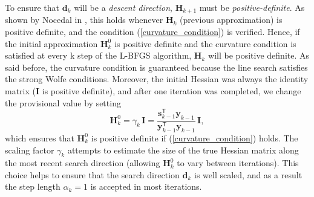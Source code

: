 To ensure that $\mathbf{d}_k$ will be a \emph{descent direction}, $\mathbf{H}_{k+1}$ must be \emph{positive-definite}.  As shown by Nocedal in \cite{Nocedal}, this holds whenever $\mathbf{H}_k$ (previous approximation) is positive definite, and the condition (\ref{curvature_condition}) is verified. Hence, if the initial approximation $\mathbf{H}^0_k$ is positive definite and the curvature condition is satisfied at every k step of the L-BFGS algorithm, $\mathbf{H}_{k}$ will be positive definite. As said before, the curvature condition is guaranteed because the line search satisfies the strong Wolfe conditions. Moreover, the initial Hessian was always the identity matrix ($\mathbf{I}$ is positive definite), and after one iteration was completed, we change the provisional value by setting
\begin{equation}\label{initial_matrix}
    \mathbf{H}_k^0 = \gamma_k \, \mathbf{I} = \frac{\mathbf{s}_{k-1}^\mathsf{T} \mathbf{y}_{k-1}}{\mathbf{y}_{k-1}^\mathsf{T}\mathbf{y}_{k-1}} \,\mathbf{I},
\end{equation}
which ensures that $\mathbf{H}_k^0$ is positive definite if (\ref{curvature_condition}) holds. The scaling factor $\gamma_k$ attempts to estimate the size of the true Hessian matrix along the most recent search direction (allowing $\mathbf{H}_k^0$ to vary between iterations). This choice helps to ensure that the search direction $\mathbf{d}_k$ is well scaled, and as a result the step length $\alpha_k = 1$ is accepted in most iterations. 

